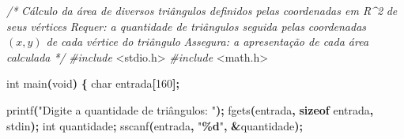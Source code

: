 \documentclass[
  11pt,
  a4paper,
]{scrbook}
\newenvironment{Shaded}{\begin{snugshade}}{\end{snugshade}}
\newcommand{\CommentTok}[1]{\textcolor[rgb]{0.56,0.35,0.01}{\textit{#1}}}
\newcommand{\DataTypeTok}[1]{\textcolor[rgb]{0.13,0.29,0.53}{#1}}
\newcommand{\DecValTok}[1]{\textcolor[rgb]{0.00,0.00,0.81}{#1}}
\newcommand{\ImportTok}[1]{#1}
\newcommand{\KeywordTok}[1]{\textcolor[rgb]{0.13,0.29,0.53}{\textbf{#1}}}
\newcommand{\NormalTok}[1]{#1}
\newcommand{\OperatorTok}[1]{\textcolor[rgb]{0.81,0.36,0.00}{\textbf{#1}}}
\newcommand{\PreprocessorTok}[1]{\textcolor[rgb]{0.56,0.35,0.01}{\textit{#1}}}
\newcommand{\SpecialCharTok}[1]{\textcolor[rgb]{0.81,0.36,0.00}{\textbf{#1}}}
\newcommand{\StringTok}[1]{\textcolor[rgb]{0.31,0.60,0.02}{#1}}
\begin{document}
\begin{Shaded}
\begin{Highlighting}[]
\CommentTok{/*}
\CommentTok{Cálculo da área de diversos triângulos definidos pelas coordenadas em R\^{}2}
\CommentTok{    de seus vértices}
\CommentTok{Requer: a quantidade de triângulos seguida pelas coordenadas $(x,y)$ de}
\CommentTok{    cada vértice do triângulo}
\CommentTok{Assegura: a apresentação de cada área calculada}
\CommentTok{*/}
\PreprocessorTok{\#include }\ImportTok{\textless{}stdio.h\textgreater{}}
\PreprocessorTok{\#include }\ImportTok{\textless{}math.h\textgreater{}}

\DataTypeTok{int}\NormalTok{ main}\OperatorTok{(}\DataTypeTok{void}\OperatorTok{)} \OperatorTok{\{}
    \DataTypeTok{char}\NormalTok{ entrada}\OperatorTok{[}\DecValTok{160}\OperatorTok{];}

\NormalTok{    printf}\OperatorTok{(}\StringTok{"Digite a quantidade de triângulos: "}\OperatorTok{);}
\NormalTok{    fgets}\OperatorTok{(}\NormalTok{entrada}\OperatorTok{,} \KeywordTok{sizeof}\NormalTok{ entrada}\OperatorTok{,}\NormalTok{ stdin}\OperatorTok{);}
    \DataTypeTok{int}\NormalTok{ quantidade}\OperatorTok{;}
\NormalTok{    sscanf}\OperatorTok{(}\NormalTok{entrada}\OperatorTok{,} \StringTok{"}\SpecialCharTok{\%d}\StringTok{"}\OperatorTok{,} \OperatorTok{\&}\NormalTok{quantidade}\OperatorTok{);}


\end{Highlighting}
\end{Shaded}
\end{document}
